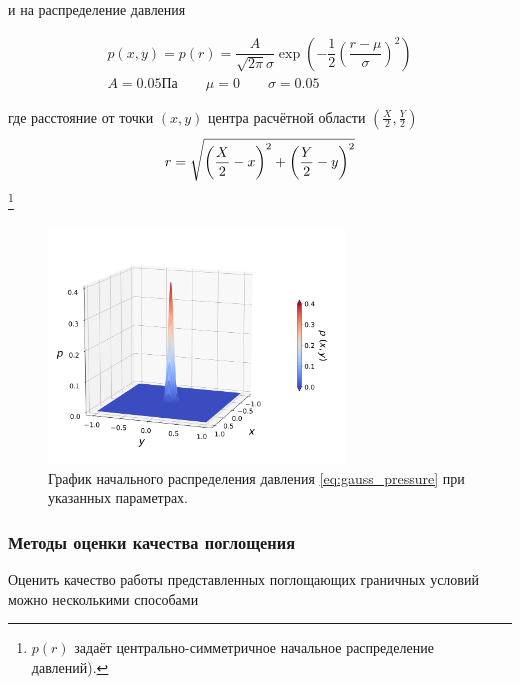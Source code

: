 и на распределение давления

\begin{equation}
\begin{gathered}
    p(x,y) = p(r) = \dfrac{A}{\sqrt{2\pi}\sigma} \exp\left(-\dfrac{1}{2}\left(\dfrac{r - \mu}{\sigma}\right)^2\right) \\
    A=0.05 \text{Па} \qquad \mu = 0 \qquad \sigma=0.05
\end{gathered}
\label{eq:gauss_pressure}
\end{equation}

где расстояние от точки $(x,y)$ центра расчётной области $\left(\frac{X}{2},\frac{Y}{2}\right)$
$$r = \sqrt{\left(\frac{X}{2} - x\right)^2+\left(\frac{Y}{2} - y\right)^2} \\
$$
\footnote{$p(r)$ задаёт центрально-симметричное начальное распределение давлений).}

\begin{figure}[H]
    \centering
    \includegraphics[trim={0pt 45pt 0pt 70pt},clip,width=0.7\textwidth]{images/pml/gauss_wavelet.png}
    \caption{График начального распределения давления  \eqref{eq:gauss_pressure} при указанных параметрах.}
    \label{fig:gauss_plot}
\end{figure}

\subsubsection{Методы оценки качества поглощения}

Оценить качество работы представленных поглощающих граничных условий можно несколькими способами

